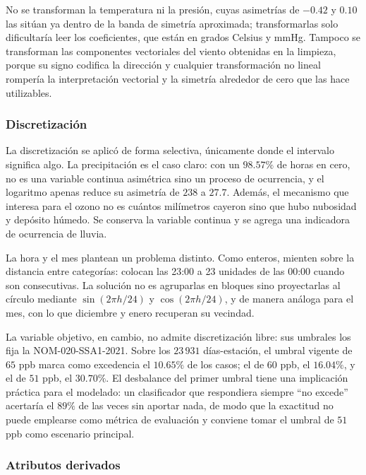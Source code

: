 No se transforman la temperatura ni la presión, cuyas asimetrías de $-0.42$ y
$0.10$ las sitúan ya dentro de la banda de simetría aproximada; transformarlas
solo dificultaría leer los coeficientes, que están en grados Celsius y mmHg.
Tampoco se transforman las componentes vectoriales del viento obtenidas en la
limpieza, porque su signo codifica la dirección y cualquier transformación no
lineal rompería la interpretación vectorial y la simetría alrededor de cero que
las hace utilizables.

\subsubsection*{Discretización}

La discretización se aplicó de forma selectiva, únicamente donde el intervalo
significa algo. La precipitación es el caso claro: con un $98.57\%$ de horas en
cero, no es una variable continua asimétrica sino un proceso de ocurrencia, y el
logaritmo apenas reduce su asimetría de $238$ a $27.7$. Además, el mecanismo que
interesa para el ozono no es cuántos milímetros cayeron sino que hubo nubosidad y
depósito húmedo. Se conserva la variable continua y se agrega una indicadora de
ocurrencia de lluvia.

La hora y el mes plantean un problema distinto. Como enteros, mienten sobre la
distancia entre categorías: colocan las 23:00 a 23 unidades de las 00:00
cuando son consecutivas. La solución no es agruparlas en bloques sino
proyectarlas al círculo mediante $\sin(2\pi h/24)$ y $\cos(2\pi h/24)$, y de
manera análoga para el mes, con lo que diciembre y enero recuperan su vecindad.

La variable objetivo, en cambio, no admite discretización libre: sus umbrales los
fija la NOM-020-SSA1-2021. Sobre los $23\,931$ días-estación, el umbral vigente
de $65$ ppb marca como excedencia el $10.65\%$ de los casos; el de $60$ ppb, el
$16.04\%$, y el de $51$ ppb, el $30.70\%$. El desbalance del primer umbral tiene
una implicación práctica para el modelado: un clasificador que respondiera
siempre \enquote{no excede} acertaría el $89\%$ de las veces sin aportar nada, de
modo que la exactitud no puede emplearse como métrica de evaluación y conviene
tomar el umbral de $51$ ppb como escenario principal.

\subsubsection*{Atributos derivados}

